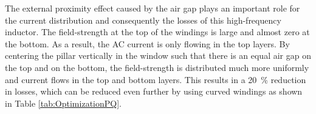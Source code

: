 \documentclass{IPEC2026}
\newcommand{\sbl}[1]{\glssymbol{#1}}
\newcommand{\ac}{\gls}
\begin{document}
The external proximity effect caused by the air gap plays an important role for the current distribution and consequently the losses of this high-frequency inductor. The field-strength at the top of the windings is large and almost zero at the bottom. As a result, the AC current is only flowing in the top layers. By centering the pillar vertically in the window such that there is an equal air gap on the top and on the bottom, the field-strength is distributed much more uniformly and current flows in the top and bottom layers. This results in a \qty{20}{\percent} reduction in losses, which can be reduced even further by using curved windings as shown in Table \ref{tab:OptimizationPQ}.


%   

\end{document}
